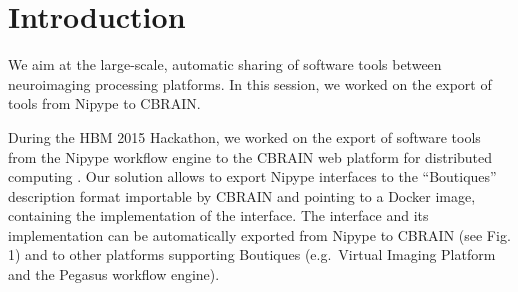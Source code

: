 \documentclass[twocolumn]{bmcart}%
\begin{document}
\begin{frontmatter}
\begin{fmbox}

	








%
\end{fmbox}%

\end{frontmatter}


\section{Introduction}\label{introduction}

We aim at the large-scale, automatic sharing of software tools between
neuroimaging processing platforms. In this session, we worked on the
export of tools from Nipype to CBRAIN.

During the HBM 2015 Hackathon, we worked on the export of software tools
from the Nipype workflow engine \cite{Gorgolewski2011} to the CBRAIN web
platform for distributed computing \cite{sherif2014cbrain}. Our solution
allows to export Nipype interfaces to the ``Boutiques'' description
format importable by CBRAIN and pointing to a Docker image, containing
the implementation of the interface. The interface and its
implementation can be automatically exported from Nipype to CBRAIN (see
Fig. 1) and to other platforms supporting Boutiques (e.g.~Virtual
Imaging Platform and the Pegasus workflow engine).
\end{document}

